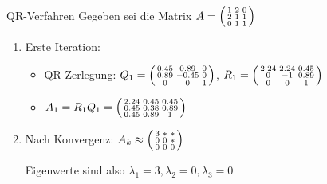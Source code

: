 \begin{example2}{QR-Verfahren}
Gegeben sei die Matrix
$A = \begin{psmallmatrix} 
1 & 2 & 0 \\
2 & 1 & 1 \\
0 & 1 & 1
\end{psmallmatrix}$

\begin{enumerate}
    \item Erste Iteration:
    \begin{itemize}
        \item QR-Zerlegung:
        $Q_1 = \begin{psmallmatrix} 
        0.45 & 0.89 & 0 \\
        0.89 & -0.45 & 0 \\
        0 & 0 & 1
        \end{psmallmatrix}$,
        $R_1 = \begin{psmallmatrix}
        2.24 & 2.24 & 0.45 \\
        0 & -1 & 0.89 \\
        0 & 0 & 1
        \end{psmallmatrix}$
        \item $A_1 = R_1Q_1 = \begin{psmallmatrix}
        2.24 & 0.45 & 0.45 \\
        0.45 & 0.38 & 0.89 \\
        0.45 & 0.89 & 1
        \end{psmallmatrix}$
    \end{itemize}

    \item Nach Konvergenz:
    $A_k \approx \begin{psmallmatrix}
    3 & * & * \\
    0 & 0 & * \\
    0 & 0 & 0
    \end{psmallmatrix}$

    Eigenwerte sind also $\lambda_1 = 3, \lambda_2 = 0, \lambda_3 = 0$
\end{enumerate}
\end{example2}

